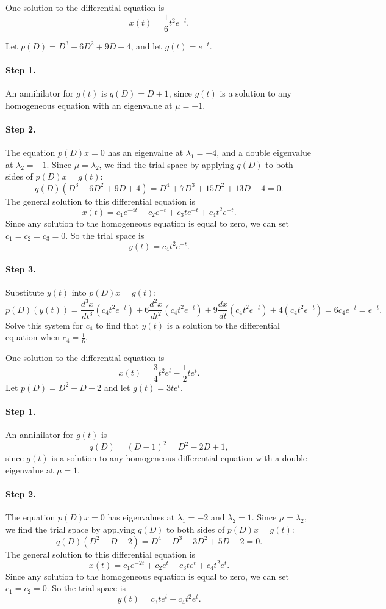 \newpage
{} \ans One solution to the differential equation is
\[
x(t) = \frac{1}{6}t^2e^{-t}.
\]

\soln Let $p(D) = D^3 + 6D^2 + 9D + 4$, and let $g(t) = e^{-t}$.
\paragraph{Step 1.} An annihilator for $g(t)$ is $q(D) = D + 1$, since
$g(t)$ is a solution to any homogeneous equation with an eigenvalue at
$\mu = -1$.

\paragraph{Step 2.} The equation $p(D)x = 0$ has an eigenvalue at
$\lambda_1 = -4$, and a double eigenvalue at $\lambda_2 = -1$.  Since
$\mu = \lambda_2$, we find the trial space by applying $q(D)$ to both
sides of $p(D)x = g(t)$:
\[
q(D)(D^3 + 6D^2 + 9D + 4) = D^4 + 7D^3 + 15D^2 + 13D + 4 = 0.
\]
The general solution to this differential equation is
\[
x(t) = c_1e^{-4t} + c_2e^{-t} + c_3te^{-t} + c_4t^2e^{-t}.
\]
Since any solution to the homogeneous equation is equal to zero, we can set
$c_1 = c_2 = c_3 = 0$.  So the trial space is
\[
y(t) = c_4t^2e^{-t}.
\]
\paragraph{Step 3.} Substitute $y(t)$ into $p(D)x = g(t)$:
\[
p(D)(y(t)) = \frac{d^3x}{dt^3}(c_4t^2e^{-t}) +
6\frac{d^2x}{dt^2}(c_4t^2e^{-t}) + 9\frac{dx}{dt}(c_4t^2e^{-t}) +
4(c_4t^2e^{-t}) = 6c_4e^{-t} =  e^{-t}.
\]
Solve this system for $c_4$ to find that $y(t)$ is a solution to the
differential equation when $c_4 = \frac{1}{6}$.

 \ans One solution to the differential equation is
\[
x(t) = \frac{3}{4}t^2e^t - \frac{1}{2}te^t.
\]
\soln Let $p(D) = D^2 + D - 2$ and let $g(t) = 3te^t$.

\paragraph{Step 1.} An annihilator for $g(t)$ is
\[
q(D) = (D - 1)^2 = D^2 - 2D + 1,
\]
since $g(t)$ is a solution to any homogeneous differential equation
with a double eigenvalue at $\mu = 1$.

\paragraph{Step 2.} The equation $p(D)x = 0$ has eigenvalues at
$\lambda_1 = -2$ and $\lambda_2 = 1$.  Since $\mu = \lambda_2$, we
find the trial space by applying $q(D)$ to both sides of $p(D)x =
g(t)$:
\[
q(D)(D^2 + D - 2) = D^4 - D^3 - 3D^2 + 5D - 2 = 0.
\]
The general solution to this differential equation is
\[
x(t) = c_1e^{-2t} + c_2e^t + c_3te^t + c_4t^2e^t.
\]
Since any solution to the homogeneous equation is equal to zero, we can set
$c_1 = c_2 = 0$.  So the trial space is
\[
y(t) = c_3te^t + c_4t^2e^t.
\]
